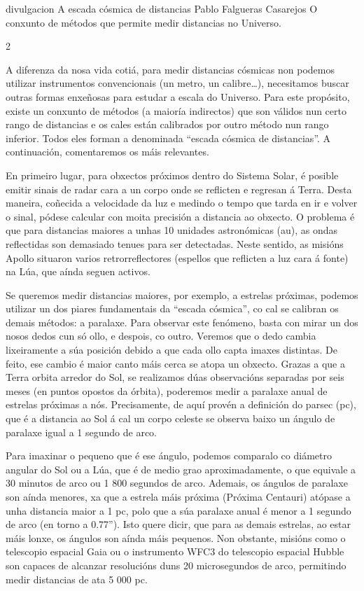 \Artigo%
{divulgacion}%
{A escada cósmica de distancias}%
{Pablo Falgueras Casarejos}%
{O conxunto de métodos que permite medir distancias no Universo.}%


\begin{multicols}{2}

A diferenza da nosa vida cotiá, para medir distancias cósmicas non podemos
utilizar instrumentos convencionais (un metro, un calibre…), necesitamos buscar
outras formas enxeñosas para estudar a escala do Universo. Para este propósito,
existe un conxunto de métodos (a maioría indirectos) que son válidos nun certo
rango de distancias e os cales están calibrados por outro método nun rango
inferior. Todos eles forman a denominada “escada cósmica de distancias”. A
continuación, comentaremos os máis relevantes.

En primeiro lugar, para obxectos próximos dentro do Sistema Solar, é posible
emitir sinais de radar cara a un corpo onde se reflicten e regresan á Terra.
Desta maneira, coñecida a velocidade da luz e medindo o tempo que tarda en ir e
volver o sinal, pódese calcular con moita precisión a distancia ao obxecto. O
problema é que para distancias maiores a unhas 10 unidades astronómicas (au),
as ondas reflectidas son demasiado tenues para ser detectadas. Neste sentido,
as misións Apollo situaron varios retrorreflectores (espellos que reflicten a
luz cara á fonte) na Lúa, que aínda seguen activos.

Se queremos medir distancias maiores, por exemplo, a estrelas próximas, podemos
utilizar un dos piares fundamentais da “escada cósmica”, co cal se calibran os
demais métodos: a paralaxe. Para observar este fenómeno, basta con mirar un dos
nosos dedos cun só ollo, e despois, co outro. Veremos que o dedo cambia
lixeiramente a súa posición debido a que cada ollo capta imaxes distintas. De
feito, ese cambio é maior canto máis cerca se atopa un obxecto. Grazas a que a
Terra orbita arredor do Sol, se realizamos dúas observacións separadas por seis
meses (en puntos opostos da órbita), poderemos medir a paralaxe anual de
estrelas próximas a nós. Precisamente, de aquí provén a definición do parsec
(pc), que é a distancia ao Sol á cal un corpo celeste se observa baixo un
ángulo de paralaxe igual a 1 segundo de arco.

Para imaxinar o pequeno que é ese ángulo, podemos comparalo co diámetro angular
do Sol ou a Lúa, que é de medio grao aproximadamente, o que equivale a 30
minutos de arco ou 1 800 segundos de arco. Ademais, os ángulos de paralaxe son
aínda menores, xa que a estrela máis próxima (Próxima Centauri) atópase a unha
distancia maior a 1 pc, polo que a súa paralaxe anual é menor a 1 segundo de
arco (en torno a 0.77”). Isto quere dicir, que para as demais estrelas, ao
estar máis lonxe, os ángulos son aínda máis pequenos. Non obstante, misións
como o telescopio espacial Gaia ou o instrumento WFC3 do telescopio espacial
Hubble son capaces de alcanzar resolucións duns 20 microsegundos de arco,
permitindo medir distancias de ata 5 000 pc.


\end{multicols}
